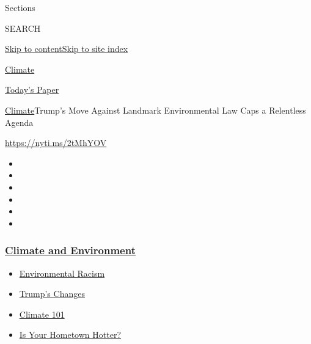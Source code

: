 Sections

SEARCH

\protect\hyperlink{site-content}{Skip to
content}\protect\hyperlink{site-index}{Skip to site index}

\href{https://www.nytimes3xbfgragh.onion/section/climate}{Climate}

\href{https://myaccount.nytimes3xbfgragh.onion/auth/login?response_type=cookie\&client_id=vi}{}

\href{https://www.nytimes3xbfgragh.onion/section/todayspaper}{Today's
Paper}

\href{/section/climate}{Climate}\textbar{}Trump's Move Against Landmark
Environmental Law Caps a Relentless Agenda

\url{https://nyti.ms/2tMhYOV}

\begin{itemize}
\item
\item
\item
\item
\item
\item
\end{itemize}

\hypertarget{climate-and-environment}{%
\subsubsection{\texorpdfstring{\href{https://www.nytimes3xbfgragh.onion/section/climate?name=styln-climate\&region=TOP_BANNER\&block=storyline_menu_recirc\&action=click\&pgtype=Article\&impression_id=b0e51df0-f2d6-11ea-a053-9b22bc94b6cf\&variant=undefined}{Climate
and
Environment}}{Climate and Environment}}\label{climate-and-environment}}

\begin{itemize}
\tightlist
\item
  \href{https://www.nytimes3xbfgragh.onion/interactive/2020/08/24/climate/racism-redlining-cities-global-warming.html?name=styln-climate\&region=TOP_BANNER\&block=storyline_menu_recirc\&action=click\&pgtype=Article\&impression_id=b0e51df1-f2d6-11ea-a053-9b22bc94b6cf\&variant=undefined}{Environmental
  Racism}
\item
  \href{https://www.nytimes3xbfgragh.onion/interactive/2020/climate/trump-environment-rollbacks.html?name=styln-climate\&region=TOP_BANNER\&block=storyline_menu_recirc\&action=click\&pgtype=Article\&impression_id=b0e51df2-f2d6-11ea-a053-9b22bc94b6cf\&variant=undefined}{Trump's
  Changes}
\item
  \href{https://www.nytimes3xbfgragh.onion/interactive/2020/04/19/climate/climate-crash-course-1.html?name=styln-climate\&region=TOP_BANNER\&block=storyline_menu_recirc\&action=click\&pgtype=Article\&impression_id=b0e51df3-f2d6-11ea-a053-9b22bc94b6cf\&variant=undefined}{Climate
  101}
\item
  \href{https://www.nytimes3xbfgragh.onion/interactive/2018/08/30/climate/how-much-hotter-is-your-hometown.html?name=styln-climate\&region=TOP_BANNER\&block=storyline_menu_recirc\&action=click\&pgtype=Article\&impression_id=b0e51df4-f2d6-11ea-a053-9b22bc94b6cf\&variant=undefined}{Is
  Your Hometown Hotter?}
\end{itemize}

